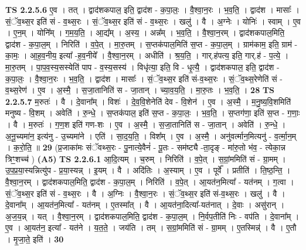 \documentclass[17pt]{extarticle}
\begin{document}
                  \newline
                                \textbf{ TS 2.2.5.6} \newline
                  ए॒व । तत् । द्वाद॑शकपाल॒ इति॒ द्वाद॑श - क॒पा॒लः॒ । वै॒श्वा॒न॒रः । भ॒व॒ति॒ । द्वाद॑श । मासाः᳚ । सं॒ॅव॒थ्स॒र इति॑ सं - व॒थ्स॒रः । सं॒ॅव॒थ्स॒र इति॑ सं - व॒थ्स॒रः । खलु॑ । वै । अ॒ग्नेः । योनिः॑ । स्वाम् । ए॒व । ए॒न॒म् । योनि᳚म् । ग॒म॒य॒ति॒ । आ॒द्य᳚म् । अ॒स्य॒ । अन्न᳚म् । भ॒व॒ति॒ । वै॒श्वा॒न॒रम् । द्वाद॑शकपाल॒मिति॒ द्वाद॑श - क॒पा॒ल॒म् । निरिति॑ । व॒पे॒त् । मा॒रु॒तम् । स॒प्तक॑पाल॒मिति॑ स॒प्त - क॒पा॒ल॒म् । ग्राम॑काम॒ इति॒ ग्राम॑ - का॒मः॒ । आ॒ह॒व॒नीय॒ इत्या᳚ -ह॒व॒नीये᳚ । वै॒श्वा॒न॒रम् । अधीति॑ । श्र॒य॒ति॒ । गार्.ह॑पत्य॒ इति॒ गार्.ह॑ - प॒त्ये॒ । मा॒रु॒तम् । पा॒प॒व॒स्य॒सस्येति॑ पाप - व॒स्य॒सस्य॑ । विधृ॑त्या॒ इति॒ वि - धृ॒त्यै॒ । द्वाद॑शकपाल॒ इति॒ द्वाद॑श - क॒पा॒लः॒ । वै॒श्वा॒न॒रः । भ॒व॒ति॒ । द्वाद॑श । मासाः᳚ । सं॒ॅव॒थ्स॒र इति॑ सं-व॒थ्स॒रः । सं॒ॅव॒थ्स॒रेणेति॑ सं - व॒थ्स॒रेण॑ । ए॒व । अ॒स्मै॒ । स॒जा॒तानिति॑ स - जा॒तान् । च्या॒व॒य॒ति॒ । मा॒रु॒तः । भ॒व॒ति॒ । \textbf{  28} \newline
                  \newline
                                \textbf{ TS 2.2.5.7} \newline
                  म॒रुतः॑ । वै । दे॒वाना᳚म् । विशः॑ । दे॒व॒वि॒शेनेति॑ देव - वि॒शेन॑ । ए॒व । अ॒स्मै॒ । म॒नु॒ष्य॒वि॒शमिति॑ मनुष्य - वि॒शम् । अवेति॑ । रु॒न्धे॒ । स॒प्तक॑पाल॒ इति॑ स॒प्त - क॒पा॒लः॒ । भ॒व॒ति॒ । स॒प्तग॑णा॒ इति॑ स॒प्त - ग॒णाः॒ । वै । म॒रुतः॑ । ग॒ण॒श इति॑ गण-शः । ए॒व । अ॒स्मै॒ । स॒जा॒तानिति॑ स - जा॒तान् । अवेति॑ । रु॒न्धे॒ । अ॒नू॒च्यमा॑न॒ इत्य॑नु - उ॒च्यमा॑ने । एति॑ । सा॒द॒य॒ति॒ । विश᳚म् । ए॒व । अ॒स्मै॒ । अनु॑वर्त्मान॒मित्यनु॑ - व॒र्त्मा॒न॒म् । क॒रो॒ति॒ ॥ \textbf{  29} \newline
                  \newline
                      (प्र॒जाका॑मः संॅवथ्स॒रः - पु॒नात्ये॒वैनं॑ - पू॒तः - सम॑ष्ट्यै -ता॒दृङ् - मा॑रु॒तो भ॑व॒ - त्येका॒न्न त्रिꣳ॒॒शच्च॑ )  \textbf{(A5)} \newline \newline
                                \textbf{ TS 2.2.6.1} \newline
                  आ॒दि॒त्यम् । च॒रुम् । निरिति॑ । व॒पे॒त् । स॒ग्रां॒ममिति॑ सं - ग्रा॒मम् । उ॒प॒प्र॒या॒स्यन्नित्यु॑प - प्र॒या॒स्यन्न् । इ॒यम् । वै । अदि॑तिः । अ॒स्याम् । ए॒व । पूर्वे᳚ । प्रतीति॑ । ति॒ष्ठ॒न्ति॒ । वै॒श्वा॒न॒रम् । द्वाद॑शकपाल॒मिति॒ द्वाद॑श - क॒पा॒ल॒म् । निरिति॑ । व॒पे॒त् । आ॒यत॑न॒मित्या᳚ - यत॑नम् । ग॒त्वा । सं॒ॅव॒थ्स॒र इति॑ सं - व॒थ्स॒रः । वै । अ॒ग्निः । वै॒श्वा॒न॒रः । सं॒ॅव॒थ्स॒र इति॑ सं-व॒थ्स॒रः । खलु॑ । वै । दे॒वाना᳚म् । आ॒यत॑न॒मित्या᳚ - यत॑नम् । ए॒तस्मा᳚त् । वै । आ॒यत॑ना॒दित्या᳚-यत॑नात् । दे॒वाः । असु॑रान् । अ॒ज॒य॒न्न् । यत् । वै॒श्वा॒न॒रम् । द्वाद॑शकपाल॒मिति॒ द्वाद॑श - क॒पा॒ल॒म् । नि॒र्वप॒तीति॑ निः - वप॑ति । दे॒वाना᳚म् । ए॒व । आ॒यत॑न॒ इत्या᳚ - यत॑ने । य॒त॒ते॒ । जय॑ति । तम् । स॒ग्रां॒ममिति॑ सं - ग्रा॒मम् । ए॒तस्मिन्न्॑ । वै । ए॒तौ । मृ॒जा॒ते॒ इति॑ । \textbf{  30} \newline
\end{document}
